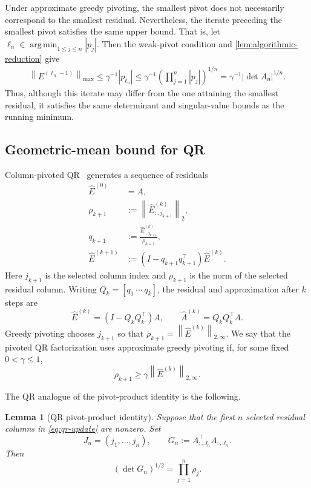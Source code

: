 \documentclass[11pt]{article}
\newtheorem{lemma}[lemma]{Lemma}
\theoremstyle{definition}
\theoremstyle{remark}
\newcommand{\norm}[1]{\left\lVert #1\right\rVert}
\newcommand{\abs}[1]{\left\lvert #1\right\rvert}
\begin{document}
Under approximate greedy pivoting, the smallest pivot does not necessarily
correspond to the smallest residual. Nevertheless, the iterate 
preceding the smallest pivot satisfies the same upper bound. That is, let
$
    \ell_n
    \in
    \operatorname*{arg\,min}_{1\le j\le n}\abs{p_j}$.
Then the weak-pivot condition and
\cref{lem:algorithmic-reduction} give
\[
\begin{aligned}
    \norm{E^{(\ell_n-1)}}_{\max} \le
    \gamma^{-1}\abs{p_{\ell_n}} \le
    \gamma^{-1}
    \left(\prod_{j=1}^n\abs{p_j}\right)^{1/n}
=
    \gamma^{-1}\abs{\det A_n}^{1/n}.
\end{aligned}
\]
Thus, although this iterate may differ from the one attaining the smallest
residual, it satisfies the same determinant and singular-value bounds as
the running minimum.

\subsection{Geometric-mean bound for QR}
\label{subsec:matrix-qr-geometric-mean}

Column-pivoted QR~\cite{BusingerGolub1965} generates a sequence of
residuals
\begin{equation}
\begin{aligned}
    \widehat E^{(0)}&=A,\\
    \rho_{k+1}
    &:=
    \norm{\widehat E^{(k)}_{:,j_{k+1}}}_2,\\
    q_{k+1}
    &:=
    \frac{\widehat E^{(k)}_{:,j_{k+1}}}{\rho_{k+1}},\\
    \widehat E^{(k+1)}
    &:=
    (I-q_{k+1}q_{k+1}^\top)\widehat E^{(k)}.
\end{aligned}
\label{eq:qr-update}
\end{equation}
Here $j_{k+1}$ is the selected column index and $\rho_{k+1}$ is the norm
of the selected residual column. Writing $Q_k=[q_1\ \cdots\ q_k]$, the
residual and approximation after $k$ steps are
\[
    \widehat E^{(k)}
    =
    (I-Q_kQ_k^\top)A,
    \qquad
    \widehat A^{(k)}
    =
    Q_kQ_k^\top A.
\]
Greedy pivoting chooses $j_{k+1}$ so that
$
    \rho_{k+1}
    =
    \norm{\widehat E^{(k)}}_{2,\infty}.
$
We say that the pivoted QR factorization uses approximate greedy pivoting
if, for some fixed $0<\gamma\le1$,
\begin{equation}
    \rho_{k+1}
    \ge
    \gamma\norm{\widehat E^{(k)}}_{2,\infty}.
    \label{eq:weak-qr-pivot}
\end{equation}

The QR analogue of the pivot-product identity is the following.
\begin{lemma}[QR pivot-product identity]
\label{lem:qr-pivot-product}
Suppose that the first $n$ selected residual columns in
\eqref{eq:qr-update} are nonzero. Set
\[
    J_n=(j_1,\ldots,j_n),
    \qquad
    G_n:=A_{:,J_n}^\top A_{:,J_n}.
\]
Then
\begin{equation*}
    (\det G_n)^{1/2}
    =
    \prod_{j=1}^n\rho_j.
\end{equation*}
\end{lemma}
\end{document}
